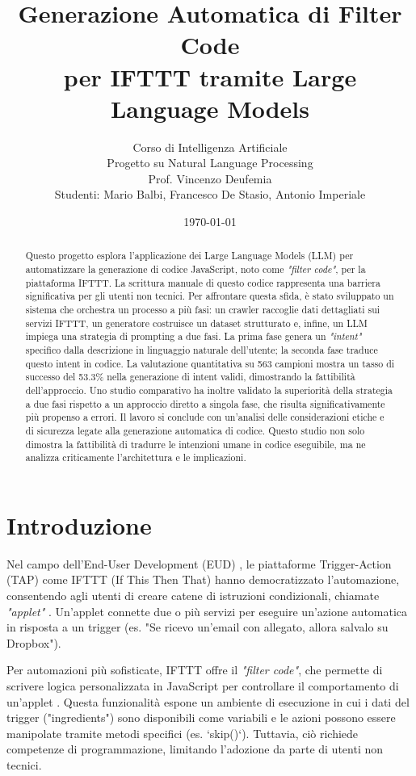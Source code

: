 \documentclass[sigconf,natbib=false]{acmart}
\title{\textbf{Generazione Automatica di Filter Code \\per IFTTT tramite Large Language Models}}
\author{Corso di Intelligenza Artificiale \\ Progetto su Natural Language Processing \\ Prof. Vincenzo Deufemia \\ \vspace{0.2cm} Studenti: Mario Balbi, Francesco De Stasio, Antonio Imperiale}
\date{\today}
\begin{document}
\begin{abstract}
Questo progetto esplora l'applicazione dei Large Language Models (LLM) per automatizzare la generazione di codice JavaScript, noto come \textit{"filter code"}, per la piattaforma IFTTT. La scrittura manuale di questo codice rappresenta una barriera significativa per gli utenti non tecnici. Per affrontare questa sfida, è stato sviluppato un sistema che orchestra un processo a più fasi: un crawler raccoglie dati dettagliati sui servizi IFTTT, un generatore costruisce un dataset strutturato e, infine, un LLM impiega una strategia di prompting a due fasi. La prima fase genera un \textit{"intent"} specifico dalla descrizione in linguaggio naturale dell'utente; la seconda fase traduce questo intent in codice. La valutazione quantitativa su 563 campioni mostra un tasso di successo del 53.3\% nella generazione di intent validi, dimostrando la fattibilità dell'approccio. Uno studio comparativo ha inoltre validato la superiorità della strategia a due fasi rispetto a un approccio diretto a singola fase, che risulta significativamente più propenso a errori. Il lavoro si conclude con un'analisi delle considerazioni etiche e di sicurezza legate alla generazione automatica di codice. Questo studio non solo dimostra la fattibilità di tradurre le intenzioni umane in codice eseguibile, ma ne analizza criticamente l'architettura e le implicazioni.
\end{abstract}

\pagestyle{plain}
\maketitle

\section{Introduzione}
Nel campo dell'End-User Development (EUD) \cite{lieberman2006end, paterno2013end, barricelli2019end}, le piattaforme Trigger-Action (TAP) come IFTTT (If This Then That) hanno democratizzato l'automazione, consentendo agli utenti di creare catene di istruzioni condizionali, chiamate \textit{"applet"} \cite{ur2014practical}. Un'applet connette due o più servizi per eseguire un'azione automatica in risposta a un trigger (es. "Se ricevo un'email con allegato, allora salvalo su Dropbox").

Per automazioni più sofisticate, IFTTT offre il \textit{"filter code"}, che permette di scrivere logica personalizzata in JavaScript per controllare il comportamento di un'applet \cite{chen2022practical}. Questa funzionalità espone un ambiente di esecuzione in cui i dati del trigger ("ingredients") sono disponibili come variabili e le azioni possono essere manipolate tramite metodi specifici (es. `skip()`). Tuttavia, ciò richiede competenze di programmazione, limitando l'adozione da parte di utenti non tecnici.
\end{document}
